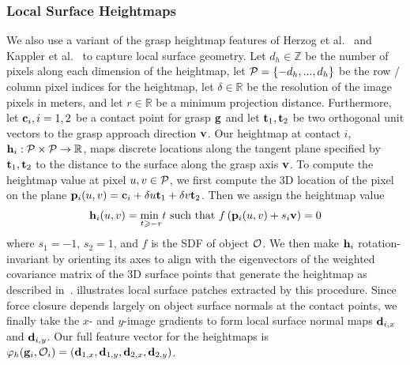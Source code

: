 \subsubsection{Local Surface Heightmaps}
We also use a variant of the grasp heightmap features of Herzog et al.~\cite{herzog2012template} and Kappler et al.~\cite{kappler2015leveraging} to capture local surface geometry.
Let $d_h \in \mathbb{Z}$ be the number of pixels along each dimension of the heightmap, let $\mathcal{P} = \{-d_h, ..., d_h\}$ be the row / column pixel indices for the heightmap, let $\delta \in \mathbb{R}$ be the resolution of the image pixels in meters, and let $r \in \mathbb{R}$ be a minimum projection distance.
Furthermore, let $\mathbf{c}_i, i = 1, 2$ be a contact point for grasp $\mathbf{g}$ and let $\mathbf{t}_1, \mathbf{t}_2$ be two orthogonal unit vectors to the grasp approach direction $\mathbf{v}$.
Our heightmap at contact $i$, $\mathbf{h}_{i}: \mathcal{P} \times \mathcal{P} \rightarrow \mathbb{R}$, maps discrete locations along the tangent plane specified by $\mathbf{t}_1, \mathbf{t}_2$ to the distance to the surface along the grasp axis $\mathbf{v}$.
To compute the heightmap value at pixel $u,v \in \mathcal{P}$, we first compute the 3D location of the pixel on the plane $\mathbf{p}_i(u,v) = \mathbf{c}_i + \delta u \mathbf{t}_1 + \delta v \mathbf{t}_2$.
Then we assign the heightmap value
\begin{align*}
	\mathbf{h}_i(u,v) = \underset{t \geqslant -r}{\text{min }} t \text{ such that } f\left( \mathbf{p}_i(u,v) + s_i \mathbf{v} \right) = 0
\end{align*}
\noindent where $s_1 = -1$, $s_2 = 1$, and $f$ is the SDF of object $\mathcal{O}$. 
We then make $\mathbf{h}_i$ rotation-invariant by orienting its axes to align with the eigenvectors of the weighted covariance matrix of the 3D surface points that generate the heightmap as described in~\cite{tombariunique}.
 illustrates local surface patches extracted by this procedure.
Since force closure depends largely on object surface normals at the contact points, we finally take the $x$- and $y$-image gradients to form local surface normal maps $\mathbf{d}_{i,x}$ and $\mathbf{d}_{i,y}$.
Our full feature vector for the heightmaps is $\varphi_{h}(\mathbf{g}_i, \mathcal{O}_i) = (\mathbf{d}_{1,x}, \mathbf{d}_{1,y}, \mathbf{d}_{2,x}, \mathbf{d}_{2,y})$.

